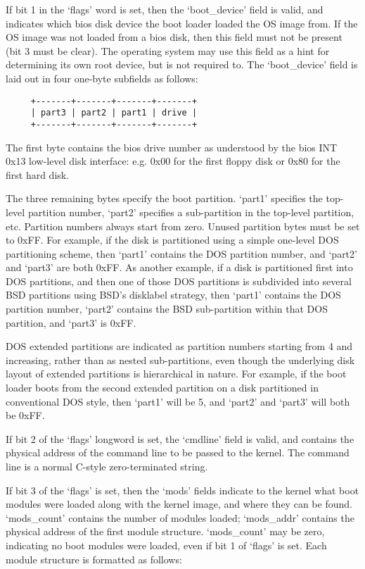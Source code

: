 If bit 1 in the ‘flags’ word is set, then the ‘boot\_device’ field is valid, and
indicates which bios disk device the boot loader loaded the OS image from. If
the OS image was not loaded from a bios disk, then this field must not be
present (bit 3 must be clear). The operating system may use this field as a hint
for determining its own root device, but is not required to. The ‘boot\_device’
field is laid out in four one-byte subfields as follows:

\begin{verbatim}
     +-------+-------+-------+-------+
     | part3 | part2 | part1 | drive |
     +-------+-------+-------+-------+
\end{verbatim}

The first byte contains the bios drive number as understood by the bios INT 0x13
low-level disk interface: e.g. 0x00 for the first floppy disk or 0x80 for the
first hard disk.

The three remaining bytes specify the boot partition. ‘part1’ specifies the
top-level partition number, ‘part2’ specifies a sub-partition in the top-level
partition, etc. Partition numbers always start from zero. Unused partition bytes
must be set to 0xFF. For example, if the disk is partitioned using a simple
one-level DOS partitioning scheme, then ‘part1’ contains the DOS partition
number, and ‘part2’ and ‘part3’ are both 0xFF. As another example, if a disk is
partitioned first into DOS partitions, and then one of those DOS partitions is
subdivided into several BSD partitions using BSD's disklabel strategy, then
‘part1’ contains the DOS partition number, ‘part2’ contains the BSD
sub-partition within that DOS partition, and ‘part3’ is 0xFF.

DOS extended partitions are indicated as partition numbers starting from 4 and
increasing, rather than as nested sub-partitions, even though the underlying
disk layout of extended partitions is hierarchical in nature. For example, if
the boot loader boots from the second extended partition on a disk partitioned
in conventional DOS style, then ‘part1’ will be 5, and ‘part2’ and ‘part3’ will
both be 0xFF.

If bit 2 of the ‘flags’ longword is set, the ‘cmdline’ field is valid, and
contains the physical address of the command line to be passed to the kernel.
The command line is a normal C-style zero-terminated string.

If bit 3 of the ‘flags’ is set, then the ‘mods’ fields indicate to the kernel
what boot modules were loaded along with the kernel image, and where they can be
found. ‘mods\_count’ contains the number of modules loaded; ‘mods\_addr’
contains the physical address of the first module structure. ‘mods\_count’ may
be zero, indicating no boot modules were loaded, even if bit 1 of ‘flags’ is
set. Each module structure is formatted as follows:

